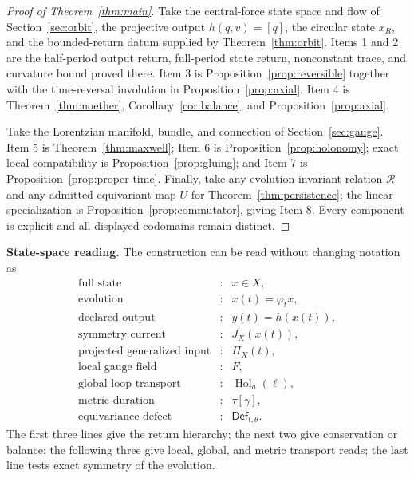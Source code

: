 \documentclass[11pt,letterpaper]{article}
\theoremstyle{dynamicsstyle}
\newcommand{\Hol}{\operatorname{Hol}}
\newcommand{\Flow}{\varphi}
\newcommand{\Defect}{\mathsf{Def}}
\begin{document}
\begin{proof}[Proof of Theorem~\ref{thm:main}]
Take the central-force state space and flow of Section~\ref{sec:orbit}, the projective output $h(q,v)=[q]$, the circular state $x_R$, and the bounded-return datum supplied by Theorem~\ref{thm:orbit}.  Items 1 and 2 are the half-period output return, full-period state return, nonconstant trace, and curvature bound proved there.  Item 3 is Proposition~\ref{prop:reversible} together with the time-reversal involution in Proposition~\ref{prop:axial}.  Item 4 is Theorem~\ref{thm:noether}, Corollary~\ref{cor:balance}, and Proposition~\ref{prop:axial}.

Take the Lorentzian manifold, bundle, and connection of Section~\ref{sec:gauge}.  Item 5 is Theorem~\ref{thm:maxwell}; Item 6 is Proposition~\ref{prop:holonomy}; exact local compatibility is Proposition~\ref{prop:gluing}; and Item 7 is Proposition~\ref{prop:proper-time}.  Finally, take any evolution-invariant relation $\mathcal R$ and any admitted equivariant map $U$ for Theorem~\ref{thm:persistence}; the linear specialization is Proposition~\ref{prop:commutator}, giving Item 8.  Every component is explicit and all displayed codomains remain distinct.
\end{proof}

\begin{resultbox}
\textbf{State-space reading.}
The construction can be read without changing notation as
\[
\begin{array}{rcl}
\text{full state} &:& x\in X,\\
\text{evolution} &:& x(t)=\Flow_tx,\\
\text{declared output} &:& y(t)=h(x(t)),\\
\text{symmetry current} &:& J_X(x(t)),\\
\text{projected generalized input} &:& \Pi_X(t),\\
\text{local gauge field} &:& F,\\
\text{global loop transport} &:& \Hol_a(\ell),\\
\text{metric duration} &:& \tau[\gamma],\\
\text{equivariance defect} &:& \Defect_{t,\theta}.
\end{array}
\]
The first three lines give the return hierarchy; the next two give conservation or balance; the following three give local, global, and metric transport reads; the last line tests exact symmetry of the evolution.
\end{resultbox}
\end{document}
